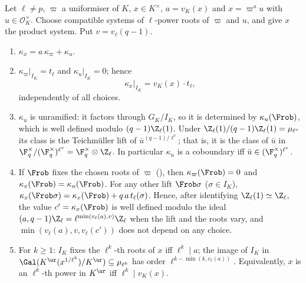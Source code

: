 \begin{theorem}\label{thm:local:kummer-inertia}
Let $\ell\ne p$, $\varpi$ a uniformiser of $K$, $x\in K^\times$, $a=v_K(x)$ and $x=\varpi^au$ with $u\in\mathcal O_K^\times$. Choose compatible systems of $\ell$-power roots of
$\varpi$ and $u$, and give $x$ the product system. Put $v=v_\ell(q-1)$.
\begin{enumerate}[label=(\roman*)]
\item $\kappa_x=a\,\kappa_\varpi+\kappa_u$.
\item $\kappa_\varpi|_{I_K}=t_\ell$ and $\kappa_u|_{I_K}=0$; hence
\[
\kappa_x|_{I_K}=v_K(x)\cdot t_\ell ,
\]
independently of all choices.
\item $\kappa_u$ is unramified: it factors through $G_K/I_K$, so it is determined by $\kappa_u(\Frob)$, which is well defined modulo $(q-1)\Z_\ell(1)$. Under
$\Z_\ell(1)/(q-1)\Z_\ell(1)=\mu_{\ell^v}$ its class is the Teichm\"uller lift of $\bar u^{(q-1)/\ell^v}$; that is, it is the class of $\bar u$ in
$\F_q^\times/(\F_q^\times)^{\ell^v}=\F_q^\times\otimes\Z_\ell$. In particular $\kappa_u$ is a coboundary iff $\bar u\in(\F_q^\times)^{\ell^v}$.
\item If $\Frob$ fixes the chosen roots of $\varpi$ (), then $\kappa_\varpi(\Frob)=0$ and $\kappa_x(\Frob)=\kappa_u(\Frob)$. For any other lift
$\Frob\sigma$ ($\sigma\in I_K$), $\kappa_x(\Frob\sigma)=\kappa_x(\Frob)+q\,a\,t_\ell(\sigma)$. Hence, after identifying $\Z_\ell(1)\simeq\Z_\ell$, the value $c'=\kappa_x(\Frob)$ is well
defined modulo the ideal $(a,q-1)\Z_\ell=\ell^{\min(v_\ell(a),v)}\Z_\ell$ when the lift and the roots vary, and $\min(v_\ell(a),v,v_\ell(c'))$ does not depend on any choice.
\item For $k\ge1$: $I_K$ fixes the $\ell^k$-th roots of $x$ iff $\ell^k\mid a$; the image of $I_K$ in $\Gal(K^{\ur}(x^{1/\ell^k})/K^{\ur})\subseteq\mu_{\ell^k}$ has order
$\ell^{k-\min(k,v_\ell(a))}$. Equivalently, $x$ is an $\ell^k$-th power in $K^{\ur}$ iff $\ell^k\mid v_K(x)$.
\end{enumerate}
\end{theorem}

